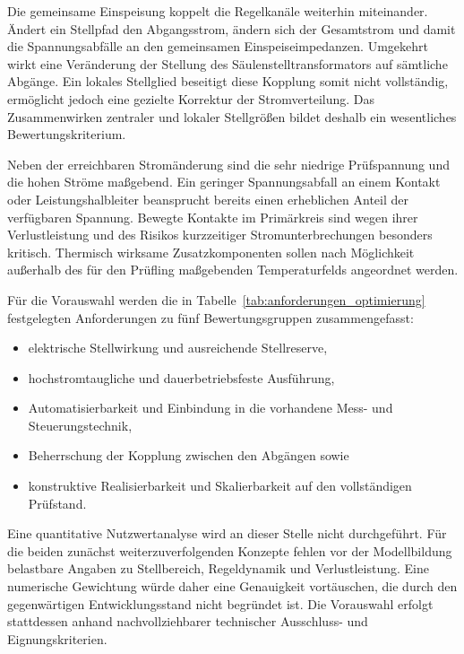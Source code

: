Die gemeinsame Einspeisung koppelt die Regelkanäle weiterhin miteinander.
Ändert ein Stellpfad den Abgangsstrom, ändern sich der Gesamtstrom und damit
die Spannungsabfälle an den gemeinsamen Einspeiseimpedanzen. Umgekehrt wirkt
eine Veränderung der Stellung des Säulenstelltransformators auf sämtliche
Abgänge. Ein lokales Stellglied beseitigt diese Kopplung somit nicht
vollständig, ermöglicht jedoch eine gezielte Korrektur der Stromverteilung.
Das Zusammenwirken zentraler und lokaler Stellgrößen bildet deshalb ein
wesentliches Bewertungskriterium.

Neben der erreichbaren Stromänderung sind die sehr niedrige Prüfspannung und
die hohen Ströme maßgebend. Ein geringer Spannungsabfall an einem Kontakt oder
Leistungshalbleiter beansprucht bereits einen erheblichen Anteil der
verfügbaren Spannung. Bewegte Kontakte im Primärkreis sind wegen ihrer
Verlustleistung und des Risikos kurzzeitiger Stromunterbrechungen besonders
kritisch. Thermisch wirksame Zusatzkomponenten sollen nach Möglichkeit
außerhalb des für den Prüfling maßgebenden Temperaturfelds angeordnet werden.

Für die Vorauswahl werden die in Tabelle~\ref{tab:anforderungen_optimierung}
festgelegten Anforderungen zu fünf Bewertungsgruppen zusammengefasst:

\begin{itemize}
    \item elektrische Stellwirkung und ausreichende Stellreserve,
    \item hochstromtaugliche und dauerbetriebsfeste Ausführung,
    \item Automatisierbarkeit und Einbindung in die vorhandene Mess- und
          Steuerungstechnik,
    \item Beherrschung der Kopplung zwischen den Abgängen sowie
    \item konstruktive Realisierbarkeit und Skalierbarkeit auf den
          vollständigen Prüfstand.
\end{itemize}

Eine quantitative Nutzwertanalyse wird an dieser Stelle nicht durchgeführt.
Für die beiden zunächst weiterzuverfolgenden Konzepte fehlen vor der
Modellbildung belastbare Angaben zu Stellbereich, Regeldynamik und
Verlustleistung. Eine numerische Gewichtung würde daher eine Genauigkeit
vortäuschen, die durch den gegenwärtigen Entwicklungsstand nicht begründet
ist. Die Vorauswahl erfolgt stattdessen anhand nachvollziehbarer technischer
Ausschluss- und Eignungskriterien.


